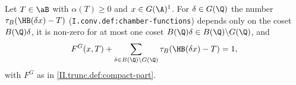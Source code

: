 Let $T\in\aB$ with $\alpha(T)\ge0$ and $x\in G(\A)^1$. For $\delta\in G(\Q)$ the number $\tau_B(\HB(\delta x)-T)$ (\texttt{I.conv.def:chamber-functions})
depends only on the coset $B(\Q)\delta$, it is non-zero for at most one coset $B(\Q)\delta\in B(\Q)\backslash G(\Q)$, and
\[
  F^G(x,T)+\sum_{\delta\in B(\Q)\backslash G(\Q)}\tau_B(\HB(\delta x)-T)=1,
\]
with $F^G$ as in \cref{II.trunc.def:compact-part}.
